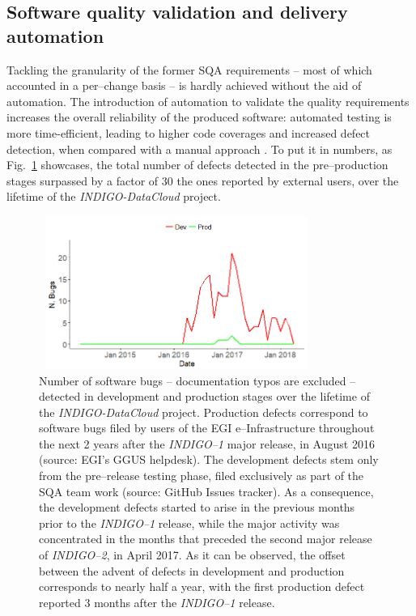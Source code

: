 \subsection{Software quality validation and delivery automation}\label{software-automation}
\label{sec:devops}
Tackling the granularity of the former SQA requirements -- most of which accounted in a per--change basis --
is hardly achieved without the aid of automation. The introduction of automation to validate the quality
requirements increases the overall reliability of the produced software: automated testing is more
time-efficient, leading to higher code coverages and increased defect detection, when compared with a manual
approach \cite{rafi2012}. To put it in numbers, as Fig.~\ref{fig:indigobugs} showcases, the
total number of defects detected in the pre--production stages surpassed by a factor of 30
the ones reported by external users, over the lifetime of the {\sl INDIGO-DataCloud}
project.
\begin{figure}[h]
\centering
\includegraphics[width=0.8\textwidth, height=50mm]{images/indigoBugs.png}
\caption{Number of software bugs -- documentation typos are excluded -- detected in development 
and production stages over the lifetime of the {\sl INDIGO-DataCloud} project. Production 
defects correspond to software bugs filed by users of the EGI e--Infrastructure throughout 
the next 2 years after the {\sl INDIGO--1} major release, in August 2016 (source: EGI's GGUS
helpdesk). The development defects stem only from the pre--release testing phase, filed 
exclusively as part of the SQA team work (source: GitHub Issues tracker). As a consequence, the 
development defects started to arise in the previous months prior to the {\sl INDIGO--1} release, 
while the major activity was concentrated in the months that preceded the second major release 
of {\sl INDIGO--2}, in April 2017. As it can be observed, the offset between the advent of defects
in development and production corresponds to nearly half a year, with the first production defect
reported 3 months after the {\sl INDIGO--1} release.}

\label{fig:indigobugs}
\end{figure}


